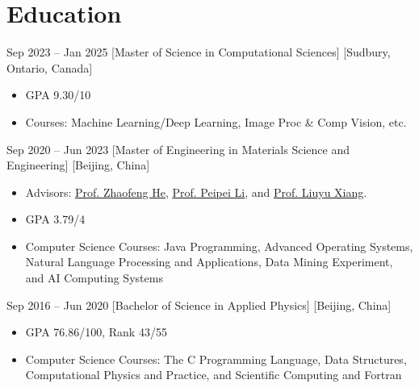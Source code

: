 \documentclass{chicv}
\begin{document}

\begin{basicinfo}

\end{basicinfo}

\section{Education}
  {Sep 2023 -- Jan 2025}
  [Master of Science in Computational Sciences]
  [Sudbury, Ontario, Canada]
  \begin{itemize}
    \item GPA 9.30/10
    \item Courses: Machine Learning/Deep Learning, Image Proc \& Comp Vision, etc.
  \end{itemize}

  {Sep 2020 -- Jun 2023}
  [Master of Engineering in Materials Science and Engineering]
  [Beijing, China]
  \begin{itemize}
    \item Advisors: \href{https://teacher.bupt.edu.cn/hezhaofeng/en/index.htm}{\underline{Prof. Zhaofeng He}}, \href{https://scholar.google.com/citations?user=A0khpKYAAAAJ&hl=en}{\underline{Prof. Peipei Li}}, and \href{https://teacher.bupt.edu.cn/xiangliuyu/en/index.htm}{\underline{Prof. Liuyu Xiang}}.
    \item GPA 3.79/4
    \item Computer Science Courses: Java Programming, Advanced Operating Systems, Natural Language Processing and Applications, Data Mining Experiment, and AI Computing Systems
  \end{itemize}

  {Sep 2016 -- Jun 2020}
  [Bachelor of Science in Applied Physics]
  [Beijing, China]
  \begin{itemize}
    \item GPA 76.86/100, Rank 43/55
    \item Computer Science Courses: The C Programming Language, Data Structures, Computational Physics and Practice, and Scientific Computing and Fortran
  \end{itemize}
\end{document}
